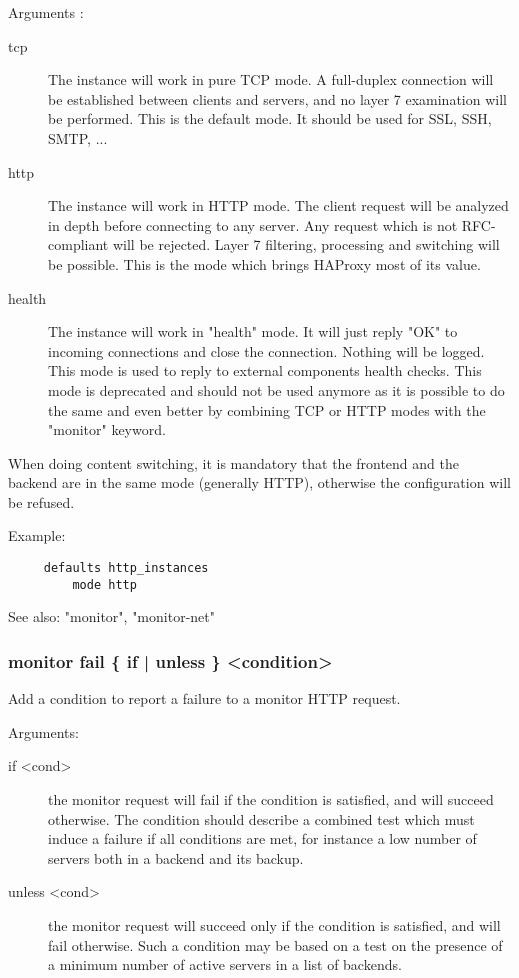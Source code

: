   Arguments :
\begin{description}
\item[tcp]       The instance will work in pure TCP mode. A full-duplex connection
              will be established between clients and servers, and no layer 7
              examination will be performed. This is the default mode. It
              should be used for SSL, SSH, SMTP, ...

\item[http]      The instance will work in HTTP mode. The client request will be
              analyzed in depth before connecting to any server. Any request
              which is not RFC-compliant will be rejected. Layer 7 filtering,
              processing and switching will be possible. This is the mode which
              brings HAProxy most of its value.

\item[health]    The instance will work in "health" mode. It will just reply "OK"
              to incoming connections and close the connection. Nothing will be
              logged. This mode is used to reply to external components health
              checks. This mode is deprecated and should not be used anymore as
              it is possible to do the same and even better by combining TCP or
              HTTP modes with the "monitor" keyword.
\end{description}

  When doing content switching, it is mandatory that the frontend and the
  backend are in the same mode (generally HTTP), otherwise the configuration
  will be refused.

  Example:
\begin{verbatim}
     defaults http_instances
         mode http
\end{verbatim}

  See also: "monitor", "monitor-net"

\subsubsection[monitor fail]{monitor fail \{ if | unless \} <condition>}
  Add a condition to report a failure to a monitor HTTP request.


  Arguments:
\begin{description}
\item[if <cond>]     the monitor request will fail if the condition is satisfied,
                  and will succeed otherwise. The condition should describe a
                  combined test which must induce a failure if all conditions
                  are met, for instance a low number of servers both in a
                  backend and its backup.

\item[unless <cond>] the monitor request will succeed only if the condition is
                  satisfied, and will fail otherwise. Such a condition may be
                  based on a test on the presence of a minimum number of active
                  servers in a list of backends.
\end{description}

